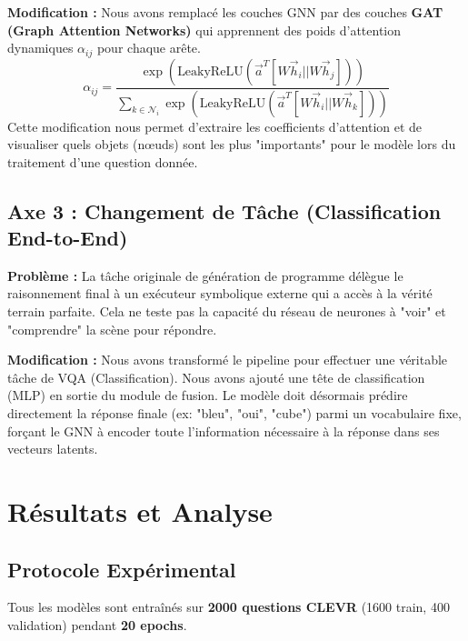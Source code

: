 \documentclass[a4paper,11pt]{article}
\begin{document}
\textbf{Modification :} Nous avons remplacé les couches GNN par des couches \textbf{GAT (Graph Attention Networks)} qui apprennent des poids d'attention dynamiques $\alpha_{ij}$ pour chaque arête.
\begin{equation}
    \alpha_{ij} = \frac{\exp(\text{LeakyReLU}(\vec{a}^T [W\vec{h}_i || W\vec{h}_j]))}{\sum_{k \in \mathcal{N}_i} \exp(\text{LeakyReLU}(\vec{a}^T [W\vec{h}_i || W\vec{h}_k]))}
\end{equation}
Cette modification nous permet d'extraire les coefficients d'attention et de visualiser quels objets (nœuds) sont les plus "importants" pour le modèle lors du traitement d'une question donnée.

\subsection{Axe 3 : Changement de Tâche (Classification End-to-End)}
\textbf{Problème :} La tâche originale de génération de programme délègue le raisonnement final à un exécuteur symbolique externe qui a accès à la vérité terrain parfaite. Cela ne teste pas la capacité du réseau de neurones à "voir" et "comprendre" la scène pour répondre.

\textbf{Modification :} Nous avons transformé le pipeline pour effectuer une véritable tâche de VQA (Classification). Nous avons ajouté une tête de classification (MLP) en sortie du module de fusion. Le modèle doit désormais prédire directement la réponse finale (ex: "bleu", "oui", "cube") parmi un vocabulaire fixe, forçant le GNN à encoder toute l'information nécessaire à la réponse dans ses vecteurs latents.

\section{Résultats et Analyse}

\subsection{Protocole Expérimental}
Tous les modèles sont entraînés sur \textbf{2000 questions CLEVR} (1600 train, 400 validation) pendant \textbf{20 epochs}.
\end{document}
